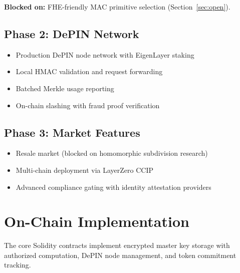 \documentclass[conference]{IEEEtran}
\begin{document}
\textbf{Blocked on:} FHE-friendly MAC primitive selection (Section~\ref{sec:open}).

\subsection{Phase 2: DePIN Network}
\begin{itemize}
\item Production DePIN node network with EigenLayer staking
\item Local HMAC validation and request forwarding
\item Batched Merkle usage reporting
\item On-chain slashing with fraud proof verification
\end{itemize}

\subsection{Phase 3: Market Features}
\begin{itemize}
\item Resale market (blocked on homomorphic subdivision research)
\item Multi-chain deployment via LayerZero CCIP
\item Advanced compliance gating with identity attestation providers
\end{itemize}

\section{On-Chain Implementation}
\label{sec:impl}

The core Solidity contracts implement encrypted master key storage with authorized
computation, DePIN node management, and token commitment tracking.
\end{document}
